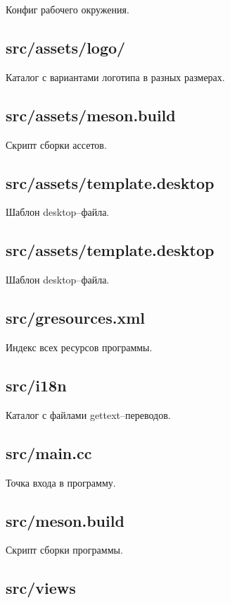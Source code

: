 \documentclass[variant=courcework]{bsuir}
\begin{document}
Конфиг рабочего окружения.

\subsection{src/assets/logo/}

Каталог с вариантами логотипа в разных размерах.

\subsection{src/assets/meson.build}

Скрипт сборки ассетов.

\subsection{src/assets/template.desktop}

Шаблон desktop--файла.

\subsection{src/assets/template.desktop}

Шаблон desktop--файла.

\subsection{src/gresources.xml}

Индекс всех ресурсов программы.

\subsection{src/i18n}

Каталог с файлами gettext--переводов.

\subsection{src/main.cc}

Точка входа в программу.

\subsection{src/meson.build}

Скрипт сборки программы.

\subsection{src/views}
\end{document}
